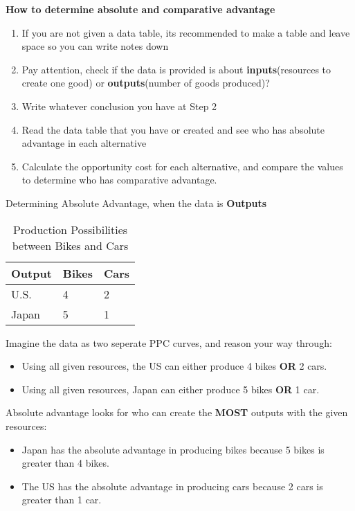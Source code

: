 \textbf{How to determine absolute and comparative advantage}
\begin{enumerate}[label=Step \arabic*:]
    \item If you are not given a data table, its recommended to make a table and leave space so you can write notes down
    \item Pay attention, check if the data is provided is about \textbf{inputs}(resources to create one good) or \textbf{outputs}(number of goods produced)?
    \item Write whatever conclusion you have at Step 2
    \item Read the data table that you have or created and see who has absolute advantage in each alternative
    \item Calculate the opportunity cost for each alternative, and compare the values to determine who has comparative advantage. 
\end{enumerate}
\begin{example}
    Determining Absolute Advantage, when the data is \textbf{Outputs}
    \begin{table}[h!]
        \begin{center}
            \begin{tabular}{l|l|l}
                \toprule
                \textbf{Output} & \textbf{Bikes} & \textbf{Cars}\\
                \midrule
                U.S. & 4 & 2\\
                Japan & 5 & 1\\
                \bottomrule
            \end{tabular}
            \caption{Production Possibilities between Bikes and Cars}
            \label{tab:table2}
        \end{center}
    \end{table}

Imagine the data as two seperate PPC curves, and reason your way through:
\begin{itemize}
    \item Using all given resources, the US can either produce 4 bikes \textbf{OR} 2 cars. 
    \item Using all given resources, Japan can either produce 5 bikes \textbf{OR} 1 car.
\end{itemize}

Absolute advantage looks for who can create the \textbf{MOST} outputs with the given resources:
\begin{itemize}
    \item Japan has the absolute advantage in producing bikes because 5 bikes is greater than 4 bikes. 
    \item The US has the absolute advantage in producing cars because 2 cars is greater than 1 car. 
\end{itemize}
\end{example}
